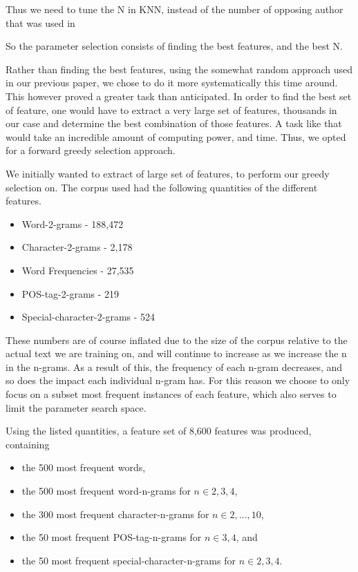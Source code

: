 Thus we need to tune the N in \gls{KNN}, instead of the number of opposing
author that was used in \cite{US}

So the parameter selection consists of finding the best features, and the best
N.

Rather than finding the best features, using the somewhat random approach used
in our previous paper\cite{US}, we chose to do it more systematically this time
around. This however proved a greater task than anticipated. In order to find
the best set of feature, one would have to extract a very large set of features,
thousands in our case and determine the best combination of those features. A
task like that would take an incredible amount of computing power, and time.
Thus, we opted for a forward greedy selection approach.

We initially wanted to extract of large set of features, to perform our greedy
selection on. The corpus used had the following quantities of the different
features.


\begin{itemize}
    \item Word-2-grams - 188,472
    \item Character-2-grams - 2,178
    \item Word Frequencies - 27,535
    \item \gls{POS}-tag-2-grams - 219
    \item Special-character-2-grams - 524
\end{itemize}

These numbers are of course inflated due to the size of the corpus relative
to the actual text we are training on, and will continue to increase as we
increase the n in the n-grams. As a result of this, the frequency of each n-gram
decreases, and so does the impact each individual n-gram has. For this reason we
choose to only focus on a subset most frequent instances of each feature, which
also serves to limit the parameter search space.

Using the listed quantities, a feature set of 8,600 features was produced,
containing

\begin{itemize}
    \item the 500 most frequent words,
    \item the 500 most frequent word-n-grams for $n \in {2,3,4}$,
    \item the 300 most frequent character-n-grams for $n \in {2,...,10}$,
    \item the 50 most frequent \gls{POS}-tag-n-grams for $n \in {3,4}$, and
    \item the 50 most frequent special-character-n-grams for $n \in {2,3,4}$.
\end{itemize}

